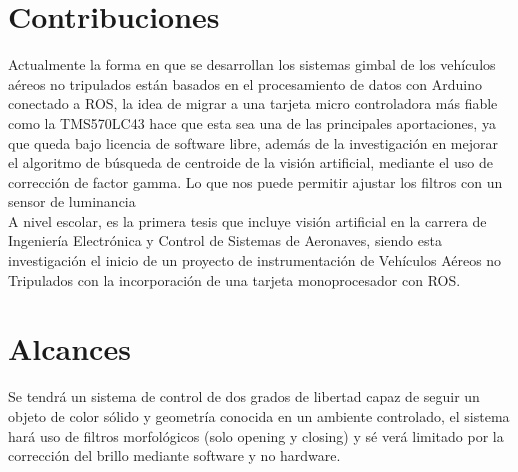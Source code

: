 \section{Contribuciones}
Actualmente la forma en que se desarrollan los sistemas gimbal de los vehículos aéreos no tripulados están basados en el procesamiento
de datos con Arduino conectado a ROS, la idea de migrar a una tarjeta micro controladora más fiable como la TMS570LC43 hace que esta sea una
de las principales aportaciones, ya que queda bajo licencia de software libre, además de la investigación en mejorar el algoritmo de búsqueda
de centroide de la visión artificial, mediante el uso de corrección de factor gamma. Lo que nos puede permitir ajustar los filtros con un sensor
de luminancia\\
A nivel escolar, es la primera tesis que incluye visión artificial en la carrera de Ingeniería Electrónica y Control de Sistemas de Aeronaves,
siendo esta investigación el inicio de un proyecto de instrumentación de Vehículos Aéreos no Tripulados con la incorporación de una tarjeta monoprocesador con ROS.

\section{Alcances}
Se tendrá un sistema de control de dos grados de libertad capaz de seguir un objeto de color sólido y geometría conocida en un ambiente controlado, el sistema hará uso
de filtros morfológicos (solo opening y closing) y sé verá limitado por la corrección del brillo mediante software y no hardware.


